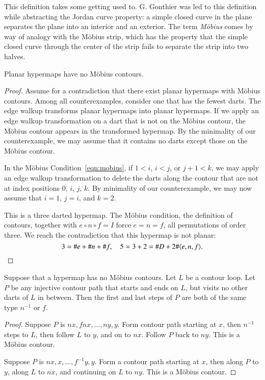 \begin{remark*}
This definition takes some getting used to.  G. Gonthier was led to
this definition while abstracting the Jordan curve property: a
simple closed curve in the plane separates the plane into an
interior and an exterior.  The term {\it M\"obius} comes by way of
analogy with the M\"obius strip, which has the property that the
simple closed curve through the center of the strip fails to
separate the strip into two halves.
\end{remark*}



\begin{lemma}  Planar hypermaps have no M\"obius contours.
\end{lemma}

\begin{proof} Assume for a contradiction that there exist planar
hypermaps with M\"obius contours.  Among all counterexamples,
consider one that has the fewest darts.  The edge walkup transforms
planar hypermaps into planar hypermaps.  If we apply an edge walkup
transformation on a dart that is not on the M\"obius contour, the
M\"obius contour appears in the transformed hypermap.  By the
minimality of our counterexample, we may assume that it contains no
darts except those on the M\"obius contour.

In the M\"obius Condition~\ref{eqn:mobius}, if $1<i$, $i<j$, or
$j+1<k$, we may apply an edge walkup transformation to  delete the
darts along the contour that are not at index positions $0$, $i$,
$j$, $k$.  By minimality of our counterexample, we may now assume
that $i=1$, $j=i$, and $k=2$.

This is a three darted hypermap.  The M\"obius condition, the
definition of contours, together with $e\circ n\circ f=I$ force
$e=n=f$, all permutations of order three. We reach the contradiction
that this hypermap is not planar:
    $$3 = \# e + \# n + \# f,\quad 5 = 3+2 = \# D + 2 \#\langle e,n,f\rangle.$$
\end{proof}

\begin{lemma}  Suppose that a hypermap has no M\"obius contours.
Let $L$ be a contour loop.  Let $P$ be any injective contour path
that starts and ends on $L$, but visits no other darts of $L$ in
between.  Then the first and last steps of $P$ are both of the same
type $n^{-1}$ or $f$.
\end{lemma}

\begin{proof}  Suppose $P$ is $n x,f n x,\ldots,n y,y$.   Form
contour path starting at $x$, then $n^{-1}$ steps to $L$, then
follow $L$ to $y$, and on to $n x$.  Follow $P$ back to $n y$.  This
is a M\"obius contour.

Suppose $P$ is $n x,x,\ldots,f^{-1} y,y$.  Form a contour path
starting at $x$, then along $P$ to $y$, along $L$ to $n x$, and
continuing on $L$ to $n y$.  This is a M\"obius contour.
\end{proof}

